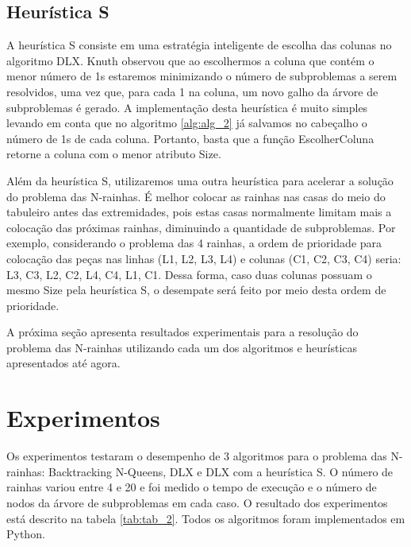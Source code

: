 \documentclass{article}
\begin{document}
\subsection{Heurística S}

A heurística S consiste em uma estratégia inteligente de escolha das colunas no algoritmo DLX. Knuth
observou que ao escolhermos a coluna que contém o menor número de 1s estaremos minimizando o
número de subproblemas a serem resolvidos, uma vez que, para cada 1 na coluna, um novo galho da árvore de subproblemas é gerado.
A implementação desta heurística é muito simples levando em conta que no algoritmo \ref{alg:alg_2} já salvamos no 
cabeçalho o número de 1s de cada coluna. Portanto, basta que a função EscolherColuna retorne a coluna com o menor
atributo Size.

Além da heurística S, utilizaremos uma outra heurística para acelerar a solução do problema das N-rainhas.
É melhor colocar as rainhas nas casas do meio do tabuleiro antes das extremidades, pois estas casas
normalmente limitam mais a colocação das próximas rainhas, diminuindo a quantidade de subproblemas.
Por exemplo, considerando o problema das 4 rainhas, a ordem de prioridade para colocação das peças nas 
linhas (L1, L2, L3, L4) e colunas (C1, C2, C3, C4) seria: L3, C3, L2, C2, L4, C4, L1, C1. Dessa forma,
caso duas colunas possuam o mesmo Size pela heurística S, o desempate será feito por meio desta ordem de prioridade.

A próxima seção apresenta resultados experimentais para a resolução do problema das N-rainhas utilizando cada um dos algoritmos
e heurísticas apresentados até agora.

\section{Experimentos}

Os experimentos testaram o desempenho de 3 algoritmos para o problema das N-rainhas: Backtracking N-Queens,
DLX e DLX com a heurística S. O número de rainhas variou entre 4 e 20 e foi medido o tempo de execução
e o número de nodos da árvore de subproblemas em cada caso. O resultado dos experimentos está descrito na tabela
\ref{tab:tab_2}. Todos os algoritmos foram implementados em Python.
\end{document}
